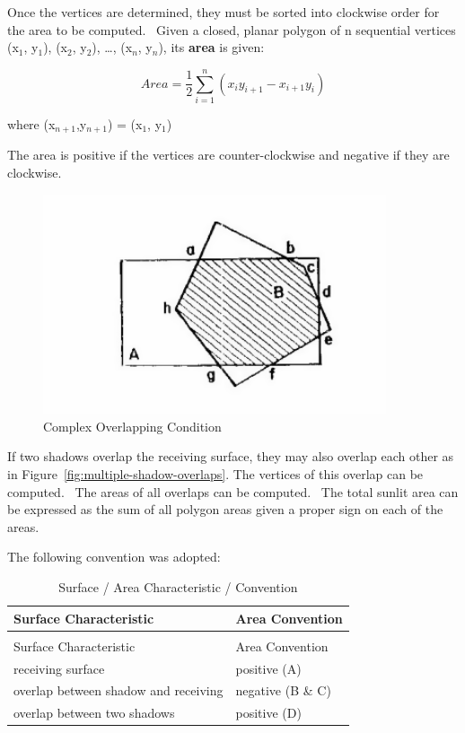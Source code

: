 Once the vertices are determined, they must be sorted into clockwise order for the area to be computed.~ Given a closed, planar polygon of n sequential vertices (x\(_{1}\), y\(_{1}\)), (x\(_{2}\), y\(_{2}\)), \ldots{}, (x\(_{n}\), y\(_{n}\)), its \textbf{area} is given:

\begin{equation}
Area = {\frac{1}{2}}\sum\limits_{i = 1}^n {({x_i}{y_{i + 1}} - {x_{i + 1}}{y_i})}
\end{equation}

where (x\(_{n+1}\),y\(_{n+1}\)) = (x\(_{1}\), y\(_{1}\))

The area is positive if the vertices are counter-clockwise and negative if they are clockwise.

\begin{figure}[hbtp] %
\centering
\includegraphics[width=0.9\textwidth, height=0.9\textheight, keepaspectratio=true]{media/image641.png}
\caption{Complex Overlapping Condition \protect \label{fig:complex-overlapping-condition}}
\end{figure}

If two shadows overlap the receiving surface, they may also overlap each other as in Figure~\ref{fig:multiple-shadow-overlaps}. The vertices of this overlap can be computed.~ The areas of all overlaps can be computed.~ The total sunlit area can be expressed as the sum of all polygon areas given a proper sign on each of the areas.

The following convention was adopted:

\begin{longtable}[c]{@{}ll@{}}
\caption{Surface / Area Characteristic / Convention \label{table:surface-area-characteristic-convention}} \tabularnewline
\toprule 
Surface Characteristic & Area Convention \tabularnewline
\midrule
\endfirsthead

\caption[]{Surface / Area Characteristic / Convention} \tabularnewline
\toprule 
Surface Characteristic & Area Convention \tabularnewline
\midrule
\endhead

receiving surface & positive (A) \tabularnewline
overlap between shadow and receiving & negative (B  \&  C) \tabularnewline
overlap between two shadows & positive (D) \tabularnewline
\bottomrule
\end{longtable}

